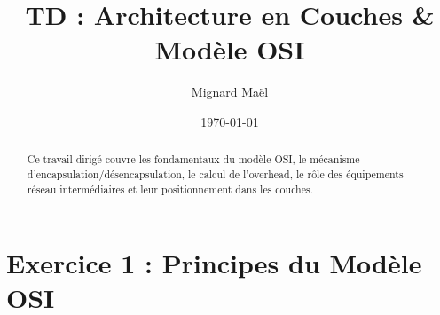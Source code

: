 \documentclass[11pt, a4paper]{article}
\title{\textbf{\Huge TD : Architecture en Couches \& Modèle OSI}}
\author{\Large Mignard Maël}
\date{\today}
\begin{document}
\maketitle
\thispagestyle{empty} 

\begin{abstract}
Ce travail dirigé couvre les fondamentaux du modèle OSI, le mécanisme d'encapsulation/désencapsulation, le calcul de l'overhead, le rôle des équipements réseau intermédiaires et leur positionnement dans les couches.
\end{abstract}

\tableofcontents
\newpage

\section{Exercice 1 : Principes du Modèle OSI}
\end{document}
